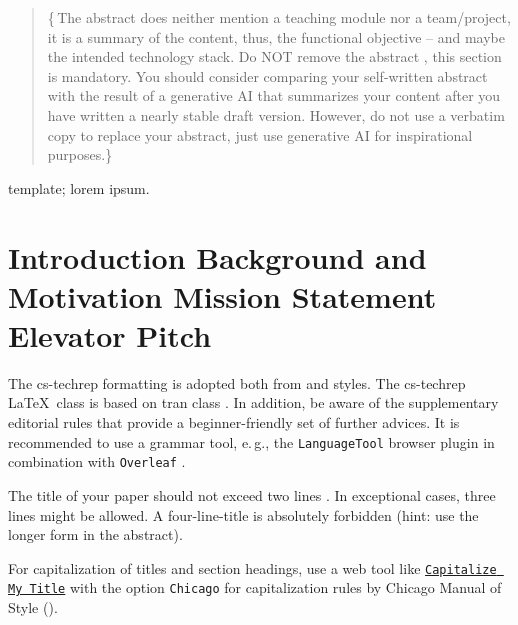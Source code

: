 \documentclass[conference,a4paper]{cs-techrep}
\begin{document}
\selectlanguage{\cstechrepLang}

\maketitle

\begin{abstract}
\lipsum[1][3-10]
\{\,\faWarning{}The abstract does neither mention a teaching module nor a team/project,
it is a summary of the content, thus, the functional objective -- and maybe the intended technology stack.
Do NOT remove the abstract \faWarning{}, this section is mandatory.
You should consider comparing your self-written abstract with the result of a generative AI that summarizes your content after you have written a nearly stable draft version. However, do not use a verbatim copy to replace your abstract, just use generative AI for inspirational purposes.\}
\end{abstract}

\begin{IEEEkeywords}
template; lorem ipsum.
\end{IEEEkeywords}

\section{Introduction \textbar{} Background and Motivation \textbar{} Mission Statement \textbar{} Elevator Pitch}

The cs-techrep formatting is adopted both from  \cite{ieee2018formattingrules} and  \cite{iaria2014formattingrules} styles.
The cs-techrep \LaTeX\ class is based on tran class \cite{ieee2015howto}.
In addition, be aware of the supplementary  editorial rules \cite{iaria2009editorialrules} \faWarning{} that provide a beginner-friendly set of further advices.
It is recommended to use a grammar tool, e.\,g., the \texttt{LanguageTool} \cite{languagetool} browser plugin in combination with \texttt{Overleaf} \cite{overleaf}.

The title of your paper should not exceed two lines \faWarning{}. In exceptional cases, three lines might be allowed. A four-line-title is absolutely forbidden (hint: use the longer form in the abstract).

For capitalization of titles and section headings, use a web tool like \href{https://capitalizemytitle.com/style/Chicago/}{\texttt{Capitalize My Title}} \faWarning{} with the option \texttt{Chicago} for capitalization rules by Chicago Manual of Style ().
\end{document}
